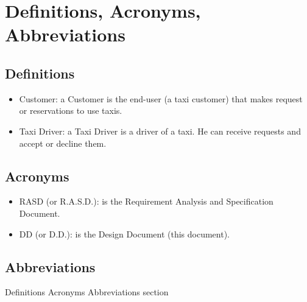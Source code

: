 \documentclass[../../../../dd.tex]{subfiles}
\begin{document}
	\section{Definitions, Acronyms, Abbreviations}

		\subsection{Definitions}
			\begin{itemize}
				\item Customer: a Customer is the end-user (a taxi customer) that makes request or reservations to use taxis.
				\item Taxi Driver: a Taxi Driver is a driver of a taxi. He can receive requests and accept or decline them.
			\end{itemize}

		\subsection{Acronyms}
			\begin{itemize}
				\item RASD (or R.A.S.D.): is the Requirement Analysis and Specification Document.
				\item DD (or D.D.): is the Design Document (this document).
			\end{itemize}

		\subsection{Abbreviations}

	Definitions Acronyms Abbreviations section
\end{document}
